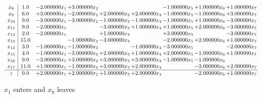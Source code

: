 \documentclass[10pt]{article}
\begin{document}
\[\begin{array}{c| c c@{\hskip 2pt} c@{\hskip 2pt} c@{\hskip 2pt} c@{\hskip 2pt} c@{\hskip 2pt} c@{\hskip 2pt} c@{\hskip 2pt} }
 x_{8}   &  1.0 & -2.000000 x_{1} & + 3.000000 x_{2} &    &   & -1.000000 x_{5} & + 1.000000 x_{6} & + 1.000000 x_{7}\\
 x_{9}   &  6.0 & + 3.000000 x_{1} & -2.000000 x_{2} & + 2.000000 x_{3} & + 2.000000 x_{4} & -1.000000 x_{5} & -1.000000 x_{6} & + 3.000000 x_{7}\\
 x_{10}   &  9.0 & -3.000000 x_{1} & -3.000000 x_{2} & -1.000000 x_{3} & -1.000000 x_{4} & -1.000000 x_{5} & + 1.000000 x_{6} & -3.000000 x_{7}\\
 x_{11}   &  9.0 & -2.000000 x_{1} &   & -3.000000 x_{3} & + 1.000000 x_{4} & + 1.000000 x_{5} & + 2.000000 x_{6} & -3.000000 x_{7}\\
 x_{12}   &  2.0 & -2.000000 x_{1} &   & + 1.000000 x_{3} &   & + 3.000000 x_{5} &   & -3.000000 x_{7}\\
 x_{13}   &  15.0  &   & -1.000000 x_{2} & -3.000000 x_{3} &   & -2.000000 x_{5} & + 2.000000 x_{6} & + 1.000000 x_{7}\\
 x_{14}   &  3.0 & -1.000000 x_{1} & -1.000000 x_{2} &   & -1.000000 x_{4} & -3.000000 x_{5} &   & -2.000000 x_{7}\\
 x_{15}   &  4.0 & -1.000000 x_{1} & -3.000000 x_{2} & + 2.000000 x_{3} & + 1.000000 x_{4} & + 2.000000 x_{5} & -1.000000 x_{6} & + 1.000000 x_{7}\\
 x_{16}   &  9.0 & -3.000000 x_{1} & + 3.000000 x_{2} & + 3.000000 x_{3} & + 3.000000 x_{4} & -1.000000 x_{5} & -1.000000 x_{6} &   \\
 x_{17}   &  11.0 & + 1.000000 x_{1} & -1.000000 x_{2} & + 3.000000 x_{3} & + 2.000000 x_{4} &   & -3.000000 x_{6} & + 2.000000 x_{7}\\
\hline
z    &  0.0 & + 2.000000 x_{1} & + 2.000000 x_{2} & + 1.000000 x_{3} & + 2.000000 x_{4} &   & -2.000000 x_{6} & + 1.000000 x_{7}\\
\end{array}\]


 $ x_{1} $ enters and $ x_{8} $ leaves 
\end{document}
